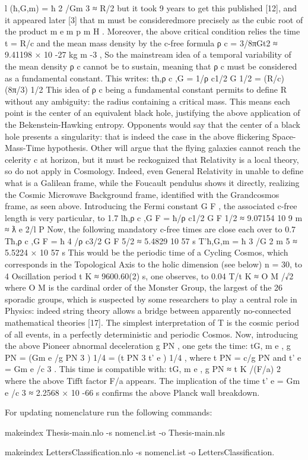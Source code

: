 l (ħ,G,m) = ħ 2 /Gm 3 ≈ R/2
but it took 9 years to get this published [12], and it appeared later [3] that m must be consideredmore precisely as the cubic root of the product m e m p m H . Moreover, the above critical condition
relies the time t = R/c and the mean mass density by the c-free formula ρ c = 3/8πGt2 ≈ 9.41198 ×
10 -27 kg m -3 , So the mainstream idea of a temporal variability of the mean density ρ c cannot be to
sustain, meaning that ρ c must be considered as a fundamental constant. This writes:
t{ħ,ρ c ,G} = 1/ρ c1/2 G 1/2 = (R/c) (8π/3) 1/2
This idea of ρ c being a fundamental constant permits to define R without any ambiguity: the
radius containing a critical mass. This means each point is the center of an equivalent black hole,
justifying the above application of the Bekenstein-Hawking entropy. Opponents would say that the
center of a black hole presents a singularity: that is indeed the case in the above flickering Space-
Mass-Time hypothesis. Other will argue that the flying galaxies cannot reach the celerity c at
horizon, but it must be reckognized that Relativity is a local theory, so do not apply in Cosmology.
Indeed, even General Relativity in unable to define what is a Galilean frame, while the Foucault
pendulus shows it directly, realizing the Cosmic Microwave Background frame, identified with the
Grandcosmos frame, as seen above.
Introducing the Fermi constant G F , the associated c-free length is very particular, to 1.7 %
l{ħ,ρ c ,G F } = ħ/ρ c1/2 G F 1/2 ≈ 9.07154 10 9 m ≈ ƛ e 2/l P
Now, the following mandatory c-free times are close each over to 0.7 %
T{ħ,ρ c ,G F } = ħ 4 /ρ c3/2 G F 5/2 ≈ 5.4829 10 57 s
T'{ħ,G,m} = ħ 3 /G 2 m 5 ≈ 5.5224 × 10 57 s
This would be the periodic time of a Cycling Cosmos, which corresponds in the Topological Axis to
the holic dimension (see below) n = 30, to 4%
Oscillation period t K ≈ 9600.60(2) s, one observes, to 0.04 %
T/t K ≈ O M /√2
where O M is the cardinal order of the Monster Group, the largest of the 26 sporadic groups, which is
suspected by some researchers to play a central role in Physics: indeed string theory allows a bridge
between apparently no-connected mathematical theories [17]. The simplest interpretation of T is the
cosmic period of all events, in a perfectly deterministic and periodic Cosmos.
Now, introducing the above Pioneer abnormal deceleration g PN , one gets the time: t{G, m e , g PN }
= (Gm e /g PN 3 ) 1/4 = (t PN 3 t' e ) 1/4 , where t PN = c/g PN and t' e = Gm e /c 3 . This time is compatible with:
t{G, m e , g PN } ≈ t K /(F/a) 2
where the above Tifft factor F/a appears. The implication of the time t' e = Gm e /c 3 ≈ 2.2568 × 10 -66 s
confirms the above Planck wall breakdown.

For updating nomenclature run the following commands:

makeindex Thesis-main.nlo -s nomencl.ist -o Thesis-main.nls

makeindex LettersClassification.nlo -s nomencl.ist -o LettersClassification.
